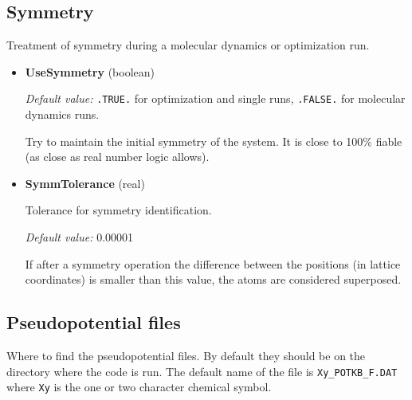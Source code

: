\documentclass[11pt]{article}
\begin{document}
\subsection{Symmetry}

Treatment of symmetry during a molecular dynamics or optimization run.

\begin{itemize}

\item{\bf UseSymmetry} (boolean)

  \textit{Default value:} \texttt{.TRUE.} for optimization and single
  runs, \texttt{.FALSE.} for molecular dynamics runs.

   Try to maintain the initial symmetry of the system.  It is close to 100\% fiable
   (as close as real number logic allows).

\item{\bf SymmTolerance} (real)

  Tolerance for symmetry identification.

  \textit{Default value:} 0.00001

   If after a symmetry operation the difference between the positions (in lattice coordinates)
   is smaller than this value, the atoms are considered superposed.

\end{itemize}


\subsection{Pseudopotential files}

Where to find the pseudopotential files.  By default they should be on the directory
where the code is run.
The default name of the file is \texttt{Xy{\_}POTKB{\_}F.DAT} where
\texttt{Xy} is the one or two character chemical symbol.
\end{document}

